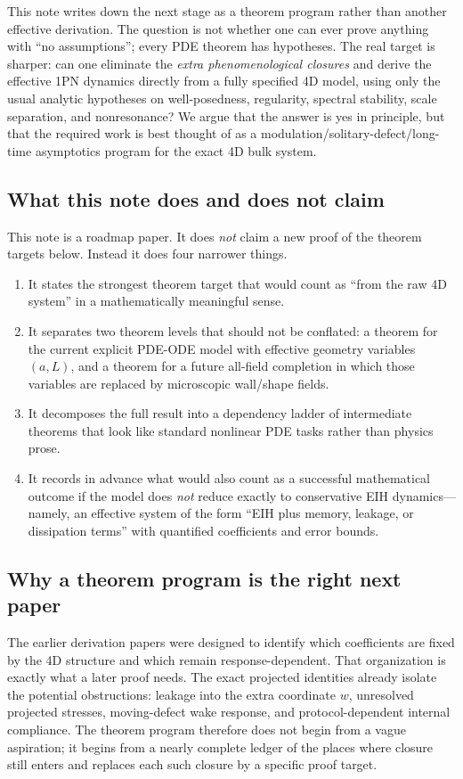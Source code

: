 \documentclass[11pt]{article}
\begin{document}
This note writes down the next stage as a theorem program rather than another effective derivation. The question is not whether one can ever prove anything with ``no assumptions''; every PDE theorem has hypotheses. The real target is sharper: can one eliminate the \emph{extra phenomenological closures} and derive the effective 1PN dynamics directly from a fully specified 4D model, using only the usual analytic hypotheses on well-posedness, regularity, spectral stability, scale separation, and nonresonance? We argue that the answer is yes in principle, but that the required work is best thought of as a modulation/solitary-defect/long-time asymptotics program for the exact 4D bulk system.

\subsection{What this note does and does not claim}

This note is a roadmap paper. It does \emph{not} claim a new proof of the theorem targets below. Instead it does four narrower things.
\begin{enumerate}[leftmargin=1.5em]
  \item It states the strongest theorem target that would count as ``from the raw 4D system'' in a mathematically meaningful sense.
  \item It separates two theorem levels that should not be conflated: a theorem for the current explicit PDE-ODE model with effective geometry variables $(a,L)$, and a theorem for a future all-field completion in which those variables are replaced by microscopic wall/shape fields.
  \item It decomposes the full result into a dependency ladder of intermediate theorems that look like standard nonlinear PDE tasks rather than physics prose.
  \item It records in advance what would also count as a successful mathematical outcome if the model does \emph{not} reduce exactly to conservative EIH dynamics---namely, an effective system of the form ``EIH plus memory, leakage, or dissipation terms'' with quantified coefficients and error bounds.
\end{enumerate}

\subsection{Why a theorem program is the right next paper}

The earlier derivation papers were designed to identify which coefficients are fixed by the 4D structure and which remain response-dependent. That organization is exactly what a later proof needs. The exact projected identities already isolate the potential obstructions: leakage into the extra coordinate $w$, unresolved projected stresses, moving-defect wake response, and protocol-dependent internal compliance. The theorem program therefore does not begin from a vague aspiration; it begins from a nearly complete ledger of the places where closure still enters and replaces each such closure by a specific proof target.
\end{document}
